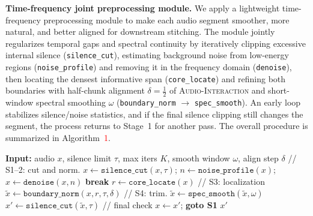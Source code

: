 \documentclass{article}
\begin{document}
\noindent
\begin{minipage}[t]{0.5\textwidth}
\textbf{Time-frequency joint preprocessing module.} We apply a lightweight time-frequency preprocessing module to make each audio segment smoother, more natural, and better aligned for downstream stitching. The module jointly regularizes temporal gaps and spectral continuity by iteratively clipping excessive internal silence (\texttt{silence\_cut}), estimating background noise from low-energy regions (\texttt{noise\_profile}) and removing it in the frequency domain (\texttt{denoise}), then locating the densest informative span (\texttt{core\_locate}) and refining both boundaries with half-chunk alignment $\delta=\frac{1}{2}$ of \textsc{Audio-Interaction} and short-window spectral smoothing $\omega$ (\texttt{boundary\_norm} $\rightarrow$ \texttt{spec\_smooth}). An early loop stabilizes silence/noise statistics, and if the final silence clipping still changes the segment, the process returns to Stage~1 for another pass. The overall procedure is summarized in Algorithm~\textcolor{red}{1}.

\end{minipage}
\hfill
\begin{minipage}[t]{0.48\textwidth}
\vspace{-12pt}
\footnotesize

\begin{algorithm}[H]
\caption{TFJP Module Pipeline}
\begin{algorithmic}[1]
\State \textbf{Input:} audio $x$, silence limit $\tau$, max iters $K$, smooth window $\omega$, align step $\delta$
    \hfill {\color{blue}// S1--2: cut and norm.}
    \State $x \gets \texttt{silence\_cut}(x,\tau)$; $n \gets \texttt{noise\_profile}(x)$; $x \gets \texttt{denoise}(x,n)$
     \textbf{break} \EndIf
\EndFor
\State $r \gets \texttt{core\_locate}(x)$ \hfill {\color{blue}// S3: localization}
\State $\tilde{x} \gets \texttt{boundary\_norm}(x,r,\tau,\delta)$ \hfill {\color{blue}// S4: trim.}
\State $\tilde{x} \gets \texttt{spec\_smooth}(\tilde{x},\omega)$
\State $x' \gets \texttt{silence\_cut}(\tilde{x},\tau)$ \hfill {\color{blue}// final check}
 $x \gets x'$; \textbf{goto S1} \Else \Return $x'$ \EndIf
\end{algorithmic}
\end{algorithm}

\end{minipage}
\end{document}
